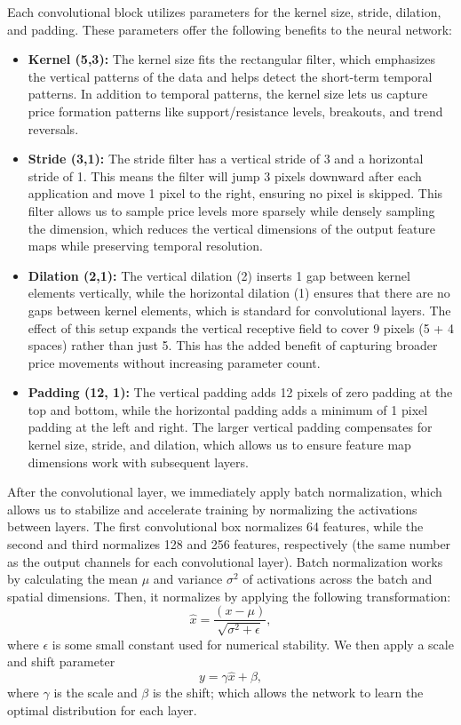 \documentclass[12pt]{article}
\begin{document}
Each convolutional block utilizes parameters for the kernel size, stride, dilation, and padding. These parameters offer the following benefits to the neural network:

\begin{itemize}
	\item \textbf{Kernel (5,3):} The kernel size fits the rectangular filter, which emphasizes the vertical patterns of the data and helps detect the short-term temporal patterns. In addition to temporal patterns, the kernel size lets us capture price formation patterns like support/resistance levels, breakouts, and trend reversals.
	\item \textbf{Stride (3,1):} The stride filter has a vertical stride of 3 and a horizontal stride of 1. This means the filter will jump 3 pixels downward after each application and move 1 pixel to the right, ensuring no pixel is skipped. This filter allows us to sample price levels more sparsely while densely sampling the dimension, which reduces the vertical dimensions of the output feature maps while preserving temporal resolution.
	\item \textbf{Dilation (2,1):} The vertical dilation (2) inserts 1 gap between kernel elements vertically, while the horizontal dilation (1) ensures that there are no gaps between kernel elements, which is standard for convolutional layers. The effect of this setup expands the vertical receptive field to cover 9 pixels (5 + 4 spaces) rather than just 5. This has the added benefit of capturing broader price movements without increasing parameter count.
	\item \textbf{Padding (12, 1):} The vertical padding adds 12 pixels of zero padding at the top and bottom, while the horizontal padding adds a minimum of 1 pixel padding at the left and right. The larger vertical padding compensates for kernel size, stride, and dilation, which allows us to ensure feature map dimensions work with subsequent layers.
\end{itemize}
After the convolutional layer, we immediately apply batch normalization, which allows us to stabilize and accelerate training by normalizing the activations between layers. The first convolutional box normalizes 64 features, while the second and third normalizes 128 and 256 features, respectively (the same number as the output channels for each convolutional layer). Batch normalization works by calculating the mean $\mu$ and variance $\sigma^2$ of activations across the batch and spatial dimensions. Then, it normalizes by applying the following transformation:
\begin{equation}
	\hat{x}=\frac{(x-\mu)}{\sqrt{\sigma^2+\epsilon}},
\end{equation}
where $\epsilon$ is some small constant used for numerical stability. We then apply a scale and shift parameter
\begin{equation}
	y=\gamma\hat{x}+\beta,
\end{equation}
where $\gamma$ is the scale and $\beta$ is the shift; which allows the network to learn the optimal distribution for each layer.
\end{document}
